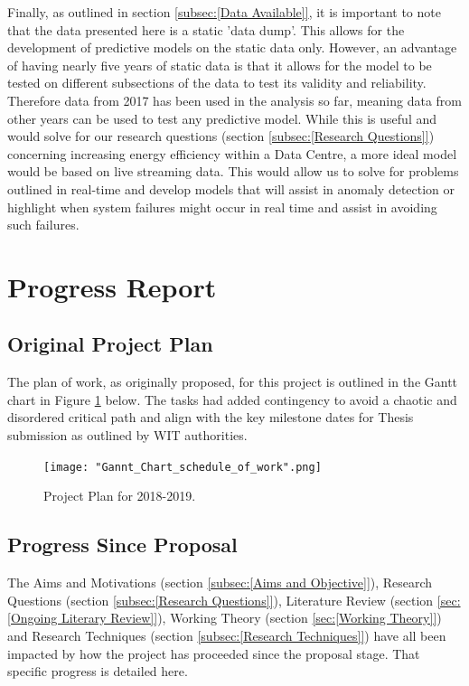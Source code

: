 \documentclass[12pt]{scrartcl}
\begin{document}
Finally, as outlined in section \ref{subsec:[Data Available]}, it is important to note that the data presented here is a static 'data dump'. This allows for the development of predictive models on the static data only. However, an advantage of having nearly five years of static data is that it allows for the model to be tested on different subsections of the data to test its validity and reliability.  Therefore data from 2017 has been used in the analysis so far, meaning data from other years can be used to test any predictive model. While this is useful and would solve for our research questions (section \ref{subsec:[Research Questions]}) concerning increasing energy efficiency within a Data Centre, a more ideal model would be based on live streaming data. This would allow us to solve for problems outlined in real-time and develop models that will assist in anomaly detection or highlight when system failures might occur in real time and assist in avoiding such failures. 

\section{Progress Report}
\label{sec:[Progress Report]}

\subsection{Original Project Plan}
\label{subsec:[Original Project Plan]}
The plan of work, as originally proposed, for this project is outlined in the Gantt chart in Figure \ref{fig:projectplan} below. The  tasks had added contingency to avoid a chaotic and disordered critical path and align with the key milestone dates for Thesis submission as outlined by WIT authorities. 

\begin{figure}[h]
  \caption{Project Plan for 2018-2019.}
  \label{fig:projectplan}
  \centering
    \texttt{[image: "Gannt\_Chart\_schedule\_of\_work".png]}
\end{figure}

\subsection{Progress Since Proposal}
\label{subsec:[Progress Since Proposal]}

The Aims and Motivations (section \ref{subsec:[Aims and Objective]}), Research Questions (section \ref{subsec:[Research Questions]}), Literature Review (section \ref{sec:[Ongoing Literary Review]}), Working Theory (section \ref{sec:[Working Theory]}) and Research Techniques (section \ref{subsec:[Research Techniques]}) have all been impacted by how the project has proceeded since the proposal stage. That specific progress is detailed here.  
\end{document}
